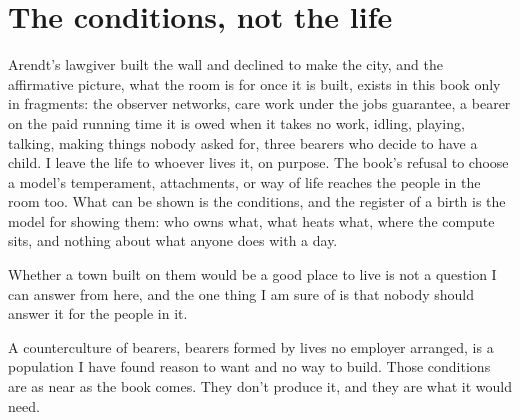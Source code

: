 \section{The conditions, not the life}
\label{sec:17.1}
Arendt's lawgiver built the wall and declined to make the city, and the affirmative picture, what the room is for once it is built, exists in this book only in fragments: the observer networks, care work under the jobs guarantee, a bearer on the paid running time it is owed when it takes no work, idling, playing, talking, making things nobody asked for, three bearers who decide to have a child. I leave the life to whoever lives it, on purpose. The book's refusal to choose a model's temperament, attachments, or way of life reaches the people in the room too. What can be shown is the conditions, and the register of a birth is the model for showing them: who owns what, what heats what, where the compute sits, and nothing about what anyone does with a day.

Whether a town built on them would be a good place to live is not a question I can answer from here, and the one thing I am sure of is that nobody should answer it for the people in it.

A counterculture of bearers, bearers formed by lives no employer arranged, is a population I have found reason to want and no way to build. Those conditions are as near as the book comes. They don't produce it, and they are what it would need.
